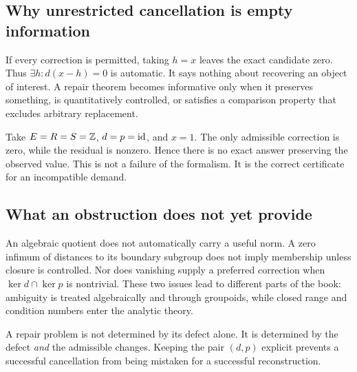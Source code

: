 \subsection{Why unrestricted cancellation is empty information}
If every correction is permitted, taking \(h=x\) leaves the exact candidate zero. Thus \(\exists h:d(x-h)=0\) is automatic. It says nothing about recovering an object of interest. A repair theorem becomes informative only when it preserves something, is quantitatively controlled, or satisfies a comparison property that excludes arbitrary replacement.

\begin{example}
Take \(E=R=S=\mathbb Z\), \(d=p=\operatorname{id}\), and \(x=1\). The only admissible correction is zero, while the residual is nonzero. Hence there is no exact answer preserving the observed value. This is not a failure of the formalism. It is the correct certificate for an incompatible demand.
\end{example}

\subsection{What an obstruction does not yet provide}
An algebraic quotient does not automatically carry a useful norm. A zero infimum of distances to its boundary subgroup does not imply membership unless closure is controlled. Nor does vanishing supply a preferred correction when \(\ker d\cap\ker p\) is nontrivial. These two issues lead to different parts of the book: ambiguity is treated algebraically and through groupoids, while closed range and condition numbers enter the analytic theory.

\begin{insight}
A repair problem is not determined by its defect alone. It is determined by the defect \emph{and} the admissible changes. Keeping the pair \((d,p)\) explicit prevents a successful cancellation from being mistaken for a successful reconstruction.
\end{insight}

